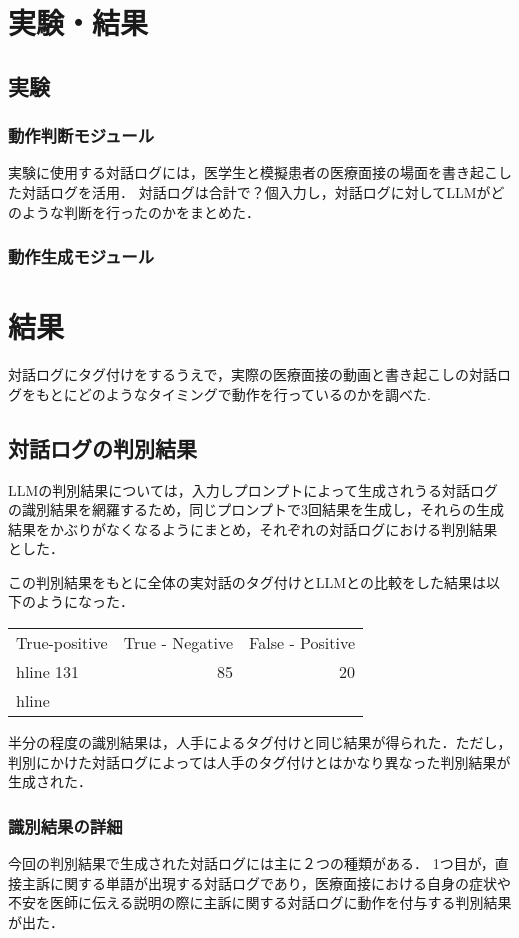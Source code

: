 \section{実験・結果}\label{result}

\subsection{実験}
\subsubsection*{動作判断モジュール}
実験に使用する対話ログには，医学生と模擬患者の医療面接の場面を書き起こした対話ログを活用．
対話ログは合計で？個入力し，対話ログに対してLLMがどのような判断を行ったのかをまとめた．

\subsubsection*{動作生成モジュール}

\section{結果}
対話ログにタグ付けをするうえで，実際の医療面接の動画と書き起こしの対話ログをもとにどのようなタイミングで動作を行っているのかを調べた.


\subsection{対話ログの判別結果}
LLMの判別結果については，入力しプロンプトによって生成されうる対話ログの識別結果を網羅するため，同じプロンプトで3回結果を生成し，それらの生成結果をかぶりがなくなるようにまとめ，それぞれの対話ログにおける判別結果
とした．

この判別結果をもとに全体の実対話のタグ付けとLLMとの比較をした結果は以下のようになった．
\begin{tabular}{|l|r|r|} \hline
True-positive & True - Negative & False - Positive \\hline
131 & 85 & 20 \\hline
\end {tabular}

半分の程度の識別結果は，人手によるタグ付けと同じ結果が得られた．ただし，判別にかけた対話ログによっては人手のタグ付けとはかなり異なった判別結果が生成された．

\subsubsection {識別結果の詳細}
今回の判別結果で生成された対話ログには主に２つの種類がある．
1つ目が，直接主訴に関する単語が出現する対話ログであり，医療面接における自身の症状や不安を医師に伝える説明の際に主訴に関する対話ログに動作を付与する判別結果が出た．

